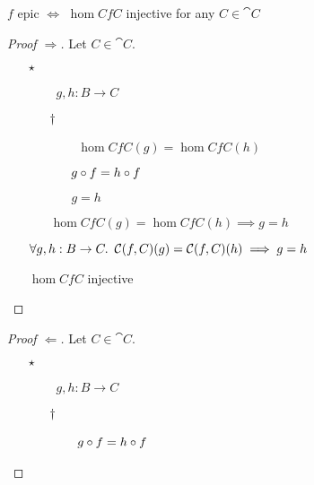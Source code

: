 \begin{prop}
  $f$ epic $\iff$ $\hom{C}{f}{C}$ injective for any $C\in\cat{C}$

  \begin{proof}[Proof $\Rightarrow$]
    Let $C\in\cat{C}$.
    \begin{itemize}
      \item[$\star$]
        \begin{itemize}
          \item[\phs] \Let~$g, h : B\to C$
            \marginnote{\Hyp}

          \item[$\dagger$]
            \begin{itemize}
            \item[\phs] \Ass~$\hom{C}{f}{C}(g) = \hom{C}{f}{C}(h)$
              \marginnote{\Hyp}

            \item[\iffs] $g\compose f = h\compose f$
              \marginnote{\Def-\ref{def:contra-hom}}

            \item[\imps] $g = h$
            \end{itemize}

          \item[\imps] $\hom{C}{f}{C}(g) = \hom{C}{f}{C}(h) \implies g = h$
            \marginnote{\imps-\Intro-$\dagger$}
        \end{itemize}
      \item[\imps] $\forall g, h : B \to C\ldotp~\hom{C}{f}{C}(g) = \hom{C}{f}{C}(h) \implies g = h$
        \marginnote{$\forall$-\Intro-$\star$}

      \item[\iffs] $\hom{C}{f}{C}$ injective
        \qedhere
    \end{itemize}
  \end{proof}

  \begin{proof}[Proof $\Leftarrow$]
    Let $C\in\cat{C}$.
    \begin{itemize}
      \item[$\star$]
        \begin{itemize}
          \item[\phs] \Let~$g, h : B\to C$
            \marginnote{\Hyp}

          \item[$\dagger$]
            \begin{itemize}
            \item[\phs] \Ass~$g\compose f = h\compose f$
              \marginnote{\Hyp}


\end{itemize}
\end{itemize}
\end{itemize}
\end{proof}
\end{prop}
